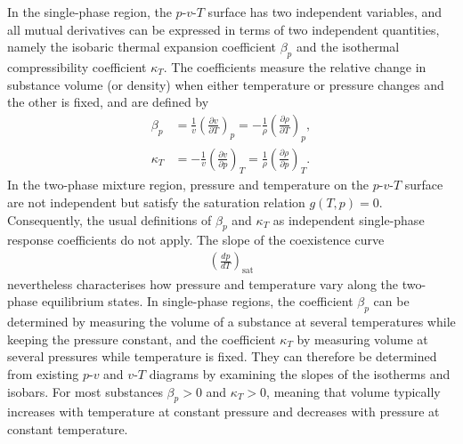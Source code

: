 In the single-phase region, the $p$-$v$-$T$ surface has two independent variables, and all mutual derivatives can be expressed in terms of two independent quantities, namely the isobaric thermal expansion coefficient $\beta_p$ and the isothermal compressibility coefficient $\kappa_T$. The coefficients measure the relative change in substance volume (or density) when either temperature or pressure changes and the other is fixed, and are defined by
\begin{align}
    \beta_p&=\frac{1}{v}\left(\frac{\partial v}{\partial T}\right)_p=-\frac{1}{\rho}\left(\frac{\partial \rho}{\partial T}\right)_p,\\
    \kappa_T&=-\frac{1}{v}\left(\frac{\partial v}{\partial p}\right)_T=\frac{1}{\rho}\left(\frac{\partial \rho}{\partial p}\right)_T.
\end{align}
In the two-phase mixture region, pressure and temperature on the $p$-$v$-$T$ surface are not independent but satisfy the saturation relation $g(T,p)=0$. Consequently, the usual definitions of $\beta_p$ and $\kappa_T$ as independent single-phase response coefficients do not apply. The slope of the coexistence curve
\begin{align}
    \left(\frac{dp}{dT}\right)_{\text{sat}}
\end{align}
nevertheless characterises how pressure and temperature vary along the two-phase equilibrium states. In single-phase regions, the coefficient $\beta_p$ can be determined by measuring the volume of a substance at several temperatures while keeping the pressure constant, and the coefficient $\kappa_T$ by measuring volume at several pressures while temperature is fixed. They can therefore be determined from existing $p$-$v$ and $v$-$T$ diagrams by examining the slopes of the isotherms and isobars. For most substances $\beta_p>0$ and $\kappa_T>0$, meaning that volume typically increases with temperature at constant pressure and decreases with pressure at constant temperature.
